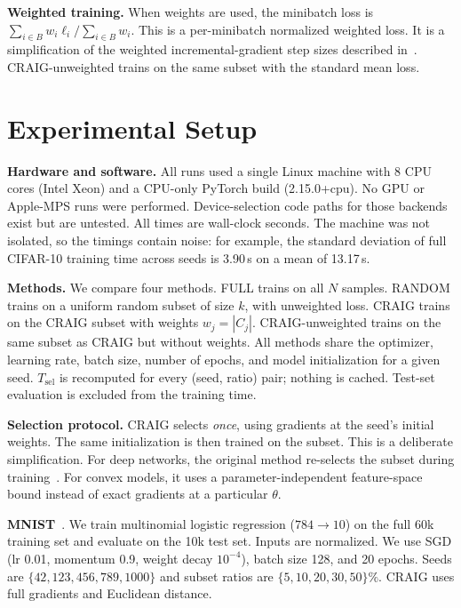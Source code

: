 \documentclass[conference]{IEEEtran}
\newcommand{\Tsel}{T_{\mathrm{sel}}}
\begin{document}
\textbf{Weighted training.} When weights are used, the minibatch loss is $\sum_{i\in B}w_i\ell_i/\sum_{i\in B}w_i$. This is a per-minibatch normalized weighted loss. It is a simplification of the weighted incremental-gradient step sizes described in~\cite{mirzasoleiman2020craig}. CRAIG-unweighted trains on the same subset with the standard mean loss.

\section{Experimental Setup}
\label{sec:setup}
\textbf{Hardware and software.} All runs used a single Linux machine with 8 CPU cores (Intel Xeon) and a CPU-only PyTorch build (2.15.0+cpu). No GPU or Apple-MPS runs were performed. Device-selection code paths for those backends exist but are untested. All times are wall-clock seconds. The machine was not isolated, so the timings contain noise: for example, the standard deviation of full CIFAR-10 training time across seeds is 3.90\,s on a mean of 13.17\,s.

\textbf{Methods.} We compare four methods. FULL trains on all $N$ samples. RANDOM trains on a uniform random subset of size $k$, with unweighted loss. CRAIG trains on the CRAIG subset with weights $w_j=|C_j|$. CRAIG-unweighted trains on the same subset as CRAIG but without weights. All methods share the optimizer, learning rate, batch size, number of epochs, and model initialization for a given seed. $\Tsel$ is recomputed for every (seed, ratio) pair; nothing is cached. Test-set evaluation is excluded from the training time.

\textbf{Selection protocol.} CRAIG selects \emph{once}, using gradients at the seed's initial weights. The same initialization is then trained on the subset. This is a deliberate simplification. For deep networks, the original method re-selects the subset during training~\cite{mirzasoleiman2020craig}. For convex models, it uses a parameter-independent feature-space bound instead of exact gradients at a particular $\theta$.

\textbf{MNIST}~\cite{lecun1998gradient}. We train multinomial logistic regression ($784\rightarrow10$) on the full 60k training set and evaluate on the 10k test set. Inputs are normalized. We use SGD (lr 0.01, momentum 0.9, weight decay $10^{-4}$), batch size 128, and 20 epochs. Seeds are $\{42,123,456,789,1000\}$ and subset ratios are $\{5,10,20,30,50\}\%$. CRAIG uses full gradients and Euclidean distance.
\end{document}
